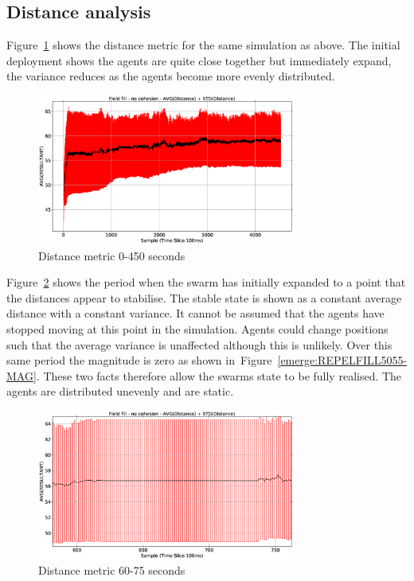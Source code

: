 \documentclass[10pt,journal,letterpaper,twoside]{IEEEtran}
\begin{document}
\subsection{Distance analysis}
Figure~\ref{emerge:REPELFILL5055-DIST} shows the distance metric for the same simulation as above. The initial deployment shows the agents are quite close together but immediately expand, the variance reduces as the agents become more evenly distributed. 

\begin{figure}
\begin{center}
\includegraphics[width=8.5cm]{figures/REPELFILL5055-DIST}
\end{center}
\caption{Distance metric 0-450 seconds\label{emerge:REPELFILL5055-DIST}}
\end{figure}

Figure~\ref{emerge:REPELFILL5055-DIST-1} shows the period when the swarm has initially expanded to a point that the distances appear to stabilise. The stable state is shown as a constant average distance with a constant variance. It cannot be assumed that the agents have stopped moving at this point in the simulation. Agents could change positions such that the average variance is unaffected although this is unlikely. Over this same period the magnitude is zero as shown in~Figure~\ref{emerge:REPELFILL5055-MAG}. These two facts therefore allow the swarms state to be fully realised. The agents are distributed unevenly and are static.

\begin{figure}
\begin{center}
\includegraphics[width=8.5cm]{figures/REPELFILL5055-DIST-1}
\end{center}
\caption{Distance metric 60-75 seconds\label{emerge:REPELFILL5055-DIST-1}}
\end{figure}
\end{document}

